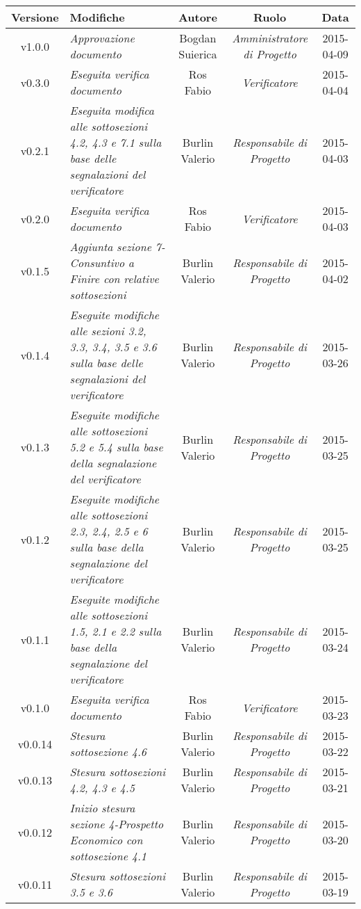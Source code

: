 \newpage

\begin{table}[h]
\centering
\begin{tabular}{|c|p{}|c|c|c|}
	\toprule
		\textbf{Versione} & \textbf{Modifiche} & \textbf{Autore} & \textbf{Ruolo} & \textbf{Data}\\
	\midrule
	\midrule
		v1.0.0 & \textit{Approvazione documento} & Bogdan Suierica & \textit{Amministratore di Progetto} & 2015-04-09\\
	\midrule
		v0.3.0 & \textit{Eseguita verifica documento} & Ros Fabio & \textit{Verificatore} & 2015-04-04\\
	\midrule
		v0.2.1 & \textit{Eseguita modifica alle sottosezioni 4.2, 4.3 e 7.1 sulla base delle segnalazioni del verificatore} & Burlin Valerio & \textit{Responsabile di Progetto} & 2015-04-03\\
	\midrule
		v0.2.0 & \textit{Eseguita verifica documento} & Ros Fabio & \textit{Verificatore} & 2015-04-03\\
	\midrule
		v0.1.5 & \textit{Aggiunta sezione 7-Consuntivo a Finire con relative sottosezioni} & Burlin Valerio & \textit{Responsabile di Progetto} & 2015-04-02\\
	\midrule
		v0.1.4 & \textit{Eseguite modifiche alle sezioni 3.2, 3.3, 3.4, 3.5 e 3.6 sulla base delle segnalazioni del verificatore} & Burlin Valerio & \textit{Responsabile di Progetto} & 2015-03-26\\
	\midrule
		v0.1.3 & \textit{Eseguite modifiche alle sottosezioni 5.2 e 5.4 sulla base della segnalazione del verificatore} & Burlin Valerio & \textit{Responsabile di Progetto} & 2015-03-25\\
	\midrule
		v0.1.2 & \textit{Eseguite modifiche alle sottosezioni 2.3, 2.4, 2.5 e 6 sulla base della segnalazione del verificatore} & Burlin Valerio & \textit{Responsabile di Progetto} & 2015-03-25\\
	\midrule
		v0.1.1 & \textit{Eseguite modifiche alle sottosezioni 1.5, 2.1 e 2.2 sulla base della segnalazione del verificatore} & Burlin Valerio & \textit{Responsabile di Progetto} & 2015-03-24\\
	\midrule
		v0.1.0 & \textit{Eseguita verifica documento} & Ros Fabio & \textit{Verificatore} & 2015-03-23\\
	\midrule
		v0.0.14 & \textit{Stesura sottosezione 4.6} & Burlin Valerio & \textit{Responsabile di Progetto} & 2015-03-22\\
	\midrule
		v0.0.13 & \textit{Stesura sottosezioni 4.2, 4.3 e 4.5} & Burlin Valerio & \textit{Responsabile di Progetto} & 2015-03-21\\
	\midrule
		v0.0.12 & \textit{Inizio stesura sezione 4-Prospetto Economico con sottosezione 4.1} & Burlin Valerio & \textit{Responsabile di Progetto} & 2015-03-20\\
	\midrule
		v0.0.11 & \textit{Stesura sottosezioni 3.5 e 3.6} & Burlin Valerio & \textit{Responsabile di Progetto} & 2015-03-19\\
	\bottomrule
\end{tabular}
\end{table}

